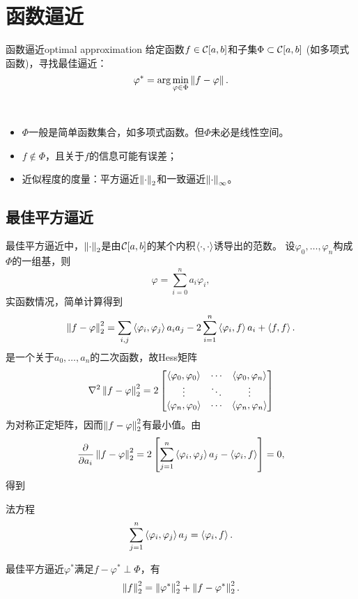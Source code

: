 \chapter{函数逼近}
\label{chap:optimal approximation}

\begin{definition}
    {函数逼近}{optimal approximation}
    给定函数$f\in\mathcal C[a,b]$和子集$\Phi\subset\mathcal C[a,b]$ (如多项式函数)，寻找最佳逼近：
    \begin{equation}
        \varphi^*=\arg\min_{\varphi\in\Phi}\left\lVert f-\varphi\right\rVert.
    \end{equation}
\end{definition}

\begin{remark}
    ~
    \begin{itemize}
        \item $\Phi$一般是简单函数集合，如多项式函数。但$\Phi$未必是线性空间。
        \item $f\notin\Phi$，且关于$f$的信息可能有误差；
        \item 近似程度的度量：平方逼近$\left\lVert\cdot\right\rVert_2$和一致逼近$\left\lVert\cdot\right\rVert_\infty$。
    \end{itemize}
\end{remark}

\section{最佳平方逼近}
\label{sec:optimal squares approximation}

最佳平方逼近中，$\left\lVert\cdot\right\rVert_2$是由$\mathcal C[a,b]$的某个内积$\left\langle \cdot,\cdot\right\rangle$诱导出的范数。
设$\varphi_0,\ldots,\varphi_n$构成$\Phi$的一组基，则
\[
    \varphi=\sum_{i=0}^na_i\varphi_i,
\]
实函数情况，简单计算得到
\[
    \left\lVert f-\varphi\right\rVert_2^2=\sum_{i,j}\left\langle \varphi_i,\varphi_j\right\rangle a_ia_j-2\sum_{i=1}^n\left\langle \varphi_i,f\right\rangle a_i+\left\langle f,f\right\rangle.
\]
是一个关于$a_0,\ldots,a_n$的二次函数，故Hess矩阵
\begin{equation}
    \nabla^2\left\lVert f-\varphi\right\rVert_2^2=2\begin{bmatrix}
        \left\langle \varphi_0,\varphi_0\right\rangle&\cdots&\left\langle \varphi_0,\varphi_n\right\rangle\\
        \vdots&\ddots&\vdots\\
        \left\langle \varphi_n,\varphi_0\right\rangle&\cdots&\left\langle \varphi_n,\varphi_n\right\rangle
    \end{bmatrix}
\end{equation}
为对称正定矩阵，因而$\left\lVert f-\varphi\right\rVert_2^2$有最小值。由
\begin{equation*}
    \frac{\partial^{{}}}{\partial{a_i}^{{}}}\left\lVert f-\varphi\right\rVert_2^2=2\left[\sum_{j=1}^n\left\langle \varphi_i,\varphi_j\right\rangle a_j-\left\langle \varphi_i,f\right\rangle\right]=0,
\end{equation*}
得到
\begin{theorem}
    {法方程}{}
    \begin{equation}
        \sum_{j=1}^n\left\langle \varphi_i,\varphi_j\right\rangle a_j=\left\langle \varphi_i,f\right\rangle.
    \end{equation}
\end{theorem}

\begin{remark}
    最佳平方逼近$\varphi^*$满足$f-\varphi^*\perp\Phi$，有
    \begin{equation}
        \left\lVert f\right\rVert_2^2=\left\lVert\varphi^*\right\rVert_2^2+\left\lVert f-\varphi^*\right\rVert_2^2.
    \end{equation}
\end{remark}

